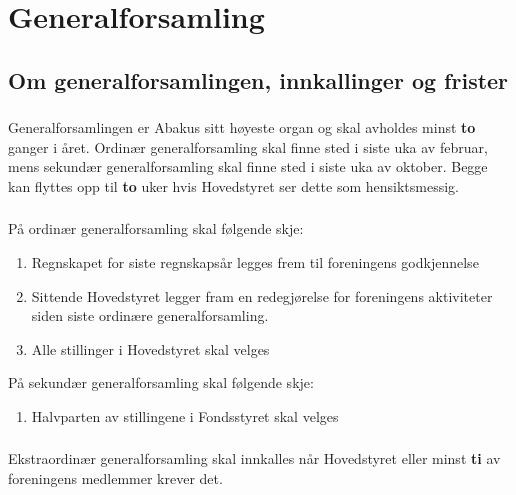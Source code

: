 \section{Generalforsamling}
\subsection{Om generalforsamlingen, innkallinger og frister}
\subsubsection{}
Generalforsamlingen er Abakus sitt høyeste organ og skal avholdes minst \textbf{to} ganger i året.  
Ordinær generalforsamling skal finne sted i siste uka av februar, mens sekundær generalforsamling 
skal finne sted i siste uka av oktober. Begge kan flyttes opp til \textbf{to} uker hvis Hovedstyret ser dette som hensiktsmessig.

\subsubsection{}
På ordinær generalforsamling skal følgende skje: 
\begin{enumerate}[label=\alph*)]
    \item Regnskapet for siste regnskapsår legges frem til foreningens godkjennelse
    \item Sittende Hovedstyret legger fram en redegjørelse for foreningens aktiviteter siden siste ordinære generalforsamling.
    \item Alle stillinger i Hovedstyret skal velges
\end{enumerate}

På sekundær generalforsamling skal følgende skje:
\begin{enumerate}[label=\alph*)]
    \item Halvparten av stillingene i Fondsstyret skal velges
\end{enumerate}

\subsubsection{}
Ekstraordinær generalforsamling skal innkalles når Hovedstyret eller minst
\textbf{ti} av foreningens medlemmer krever det.

